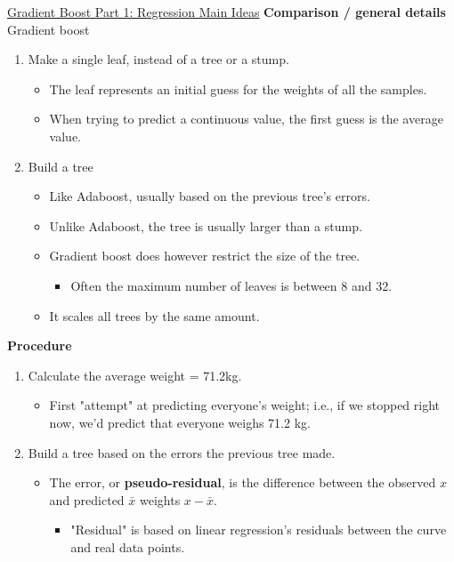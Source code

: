 \documentclass[12pt, titlepage, french]{report}
\begin{document}
\begin{YTB_SUMM_AUTO_NUMB}[label = {SQ-Boo-Reg-Idea}]{\href{https://www.youtube.com/watch?v=3CC4N4z3GJc&feature=youtu.be}{Gradient Boost Part 1: Regression Main Ideas}}
\textbf{Comparison / general details} 
Gradient boost
\begin{enumerate}[leftmargin = *]
	\item	Make a single leaf, instead of a tree or a stump.
	\begin{itemize}[leftmargin = *]
	\item	The leaf represents an initial guess for the weights of all the samples.
	\item	When trying to predict a continuous value, the first guess is the average value.
	\end{itemize}
	\item	Build a tree
	\begin{itemize}[leftmargin = *]
	\item	Like Adaboost, usually based on the previous tree's errors.      
	\item	Unlike Adaboost, the tree is usually larger than a stump.        
	\item	Gradient boost does however restrict the size of the tree.       
		\begin{itemize}[leftmargin = *]
		\item	Often the maximum number of leaves is between 8 and 32.
		\end{itemize}
	\item	It scales all trees by the same amount.
	\end{itemize}
\end{enumerate}

\tcbline

\textbf{Procedure}

\begin{enumerate}[leftmargin = *]
	\item	Calculate the average weight = 71.2kg.
	\begin{itemize}[leftmargin = *]
	\item	First "attempt" at predicting everyone's weight; i.e., if we stopped right now, we'd predict that everyone weighs 71.2 kg.
	\end{itemize}

	\item	Build a tree based on the errors the previous tree made.
	\begin{itemize}[leftmargin = *]
	\item	The error, or \textbf{pseudo-residual}, is the difference between the observed $x$ and predicted $\bar{x}$ weights $x - \bar{x}$.
		\begin{itemize}[leftmargin = *]
		\item	"Residual" is based on linear regression's residuals between the curve and real data points.
		\end{itemize}
	\end{itemize}


\end{enumerate}
\end{YTB_SUMM_AUTO_NUMB}
\end{document}
